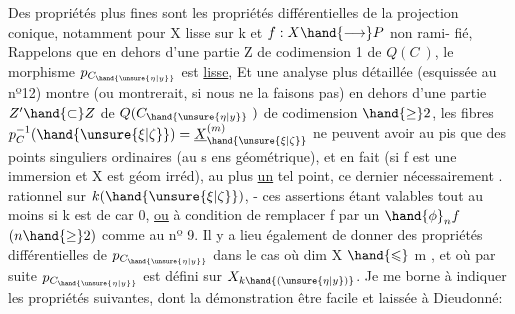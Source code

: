 Des propriétés plus fines sont les propriétés différentielles de
la projection conique, notamment pour X lisse sur k et $f:X\hand{\longrightarrow} P$ non rami-%
fié,   Rappelons que 
en dehors d'une partie Z de codimension 1 de $Q(C\ )$, le morphisme
$p_{C_{\hand{\unsure{\eta|y}}}}$  est \uline{lisse}, Et une analyse plus détaillée (esquissée au nº12) montre
(ou montrerait, si nous ne la faisons pas)   en dehors d'une partie $Z'\hand{\subset} Z$
de $Q(C_{\hand{\unsure{\eta|y}}}\ )$ de codimension $\hand{\geq} 2$, les fibres $p_C^{-1}(\hand{\unsure{\xi|\zeta}}) = \underline{X}^{(m)}_{\hand{\unsure{\xi|\zeta}}}$ ne peuvent
avoir au pis que des points  singuliers ordinaires (au s ens
géométrique), et en fait (si f est une immersion et X est géom irréd),
 au plus \uline{un} tel point, ce dernier   nécessairement  .
rationnel sur $k(\hand{\unsure{\xi|\zeta}})$, - ces assertions étant valables tout au moins si
k est de car 0, \uline{ou} à condition de remplacer f par un $\hand{\phi}_n f$ $(n\hand{\geq} 2)$ comme
au nº 9. Il y a lieu également de donner des propriétés différentielles
de $p_{C_{\hand{\unsure{\eta|y}}}}$ dans le cas où dim X $\hand{\leqslant}$ m , et où par suite $p_{C_{\hand{\unsure{\eta|y}}}}$ est défini sur $X_{k\hand{(\unsure{\eta|y})}}$.
Je me borne à indiquer les propriétés suivantes, dont la démonstration
 être facile et  laissée à Dieudonné:

